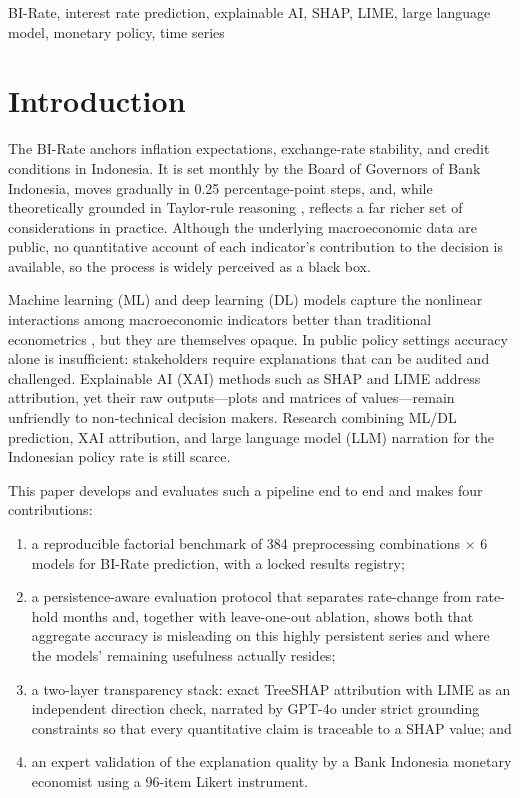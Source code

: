 \documentclass[conference]{IEEEtran}
\begin{document}
\begin{IEEEkeywords}
BI-Rate, interest rate prediction, explainable AI, SHAP, LIME, large language model, monetary policy, time series
\end{IEEEkeywords}

\section{Introduction}
The BI-Rate anchors inflation expectations, exchange-rate stability, and credit conditions in Indonesia. It is set monthly by the Board of Governors of Bank Indonesia, moves gradually in 0.25 percentage-point steps, and, while theoretically grounded in Taylor-rule reasoning \cite{taylor1993}, reflects a far richer set of considerations in practice. Although the underlying macroeconomic data are public, no quantitative account of each indicator's contribution to the decision is available, so the process is widely perceived as a black box.

Machine learning (ML) and deep learning (DL) models capture the nonlinear interactions among macroeconomic indicators better than traditional econometrics \cite{chakraborty2017}, but they are themselves opaque. In public policy settings accuracy alone is insufficient: stakeholders require explanations that can be audited and challenged. Explainable AI (XAI) methods such as SHAP \cite{lundberg2017} and LIME \cite{ribeiro2016} address attribution, yet their raw outputs---plots and matrices of values---remain unfriendly to non-technical decision makers. Research combining ML/DL prediction, XAI attribution, and large language model (LLM) narration for the Indonesian policy rate is still scarce.

This paper develops and evaluates such a pipeline end to end and makes four contributions:
\begin{enumerate}
    \item a reproducible factorial benchmark of 384 preprocessing combinations $\times$ 6 models for BI-Rate prediction, with a locked results registry;
    \item a persistence-aware evaluation protocol that separates rate-change from rate-hold months and, together with leave-one-out ablation, shows both that aggregate accuracy is misleading on this highly persistent series and where the models' remaining usefulness actually resides;
    \item a two-layer transparency stack: exact TreeSHAP attribution with LIME as an independent direction check, narrated by GPT-4o under strict grounding constraints so that every quantitative claim is traceable to a SHAP value; and
    \item an expert validation of the explanation quality by a Bank Indonesia monetary economist using a 96-item Likert instrument.
\end{enumerate}
\end{document}
